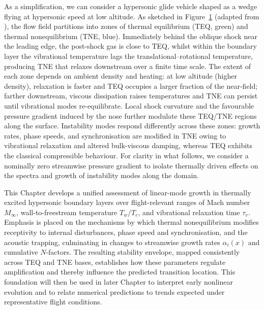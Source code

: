 As a simplification, we can consider a hypersonic glide vehicle shaped as a wedge flying at hypersonic speed at low altitude. As sketched in Figure~\ref{figure:wedgeflow} (adapted from \citet{williams2021}), the flow field partitions into zones of thermal equilibrium (\gls{TEQ}, green) and thermal nonequilibrium (\gls{TNE}, blue). Immediately behind the oblique shock near the leading edge, the post-shock gas is close to \gls{TEQ}, whilst within the boundary layer the vibrational temperature lags the translational--rotational temperature, producing \gls{TNE} that relaxes downstream over a finite time scale. The extent of each zone depends on ambient density and heating: at low altitude (higher density), relaxation is faster and \gls{TEQ} occupies a larger fraction of the near-field; farther downstream, viscous dissipation raises temperatures and \gls{TNE} can persist until vibrational modes re-equilibrate. Local shock curvature and the favourable pressure gradient induced by the nose further modulate these \gls{TEQ}/\gls{TNE} regions along the surface. Instability modes respond differently across these zones: growth rates, phase speeds, and synchronisation are modified in \gls{TNE} owing to vibrational relaxation and altered bulk-viscous damping, whereas \gls{TEQ} exhibits the classical compressible behaviour. For clarity in what follows, we consider a nominally zero streamwise pressure gradient to isolate thermally driven effects on the spectra and growth of instability modes along the domain.

\begin{figure}[t]
    \centering
    \fontsize{8}{9}\selectfont
    \label{figure:wedgeflow}
\end{figure}

This Chapter develops a unified assessment of linear-mode growth in thermally excited hypersonic boundary layers over flight-relevant ranges of Mach number $M_\infty$, wall-to-freestream temperature $T_w/T_e$, and vibrational relaxation time $\tau_v$. Emphasis is placed on the mechanisms by which thermal nonequilibrium modifies receptivity to internal disturbances, phase speed and synchronisation, and the acoustic trapping, culminating in changes to streamwise growth rates $\alpha_i(x)$ and cumulative $N$-factors. The resulting stability envelope, mapped consistently across \gls{TEQ} and \gls{TNE} bases, establishes how these parameters regulate amplification and thereby influence the predicted transition location. This foundation will then be used in later Chapter to interpret early nonlinear evolution and to relate numerical predictions to trends expected under representative flight conditions.



